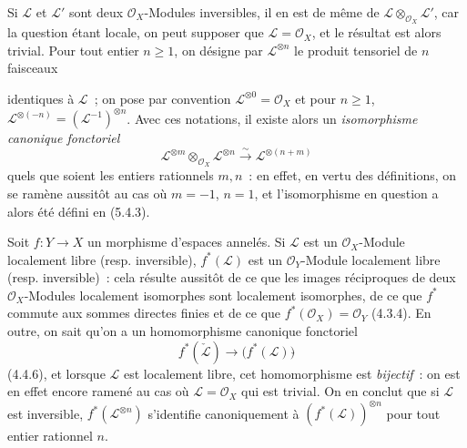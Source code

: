 \begin{env}[5.4.4]
\label{0.5.4.4-fr}
Si $\mathcal{L}$ et $\mathcal{L}'$ sont deux $\mathcal{O}_X$-Modules
inversibles, il en est de même de
$\mathcal{L}\otimes_{\mathcal{O}_X}\mathcal{L}'$, car la question étant
locale, on peut supposer que $\mathcal{L}=\mathcal{O}_X$, et le résultat est
alors trivial. Pour tout entier $n\geq1$, on désigne par
$\mathcal{L}^{\otimes n}$ le produit tensoriel de $n$ faisceaux


identiques à $\mathcal{L}$~; on pose par convention
$\mathcal{L}^{\otimes0}=\mathcal{O}_X$ et pour $n\geq1$,
$\mathcal{L}^{\otimes(-n)}=(\mathcal{L}^{-1})^{\otimes n}$. Avec ces
notations, il existe alors un \emph{isomorphisme canonique fonctoriel}
\[
  \mathcal{L}^{\otimes m}\otimes_{\mathcal{O}_X}\mathcal{L}^{\otimes n}
  \xrightarrow{\sim}
  \mathcal{L}^{\otimes(n+m)}
  \tag{5.4.4.1}\label{0.5.4.4.1-fr}
\]
quels que soient les entiers rationnels $m,n$~: en effet, en vertu des
définitions, on se ramène aussitôt au cas où $m=-1$, $n=1$, et
l'isomorphisme en question a alors été défini en (5.4.3).
\end{env}

\begin{env}[5.4.5]
Soit $f:Y\to X$ un morphisme d'espaces annelés. Si $\mathcal{L}$ est un
$\mathcal{O}_X$-Module localement libre (resp. inversible),
$f^*(\mathcal{L})$ est un $\mathcal{O}_Y$-Module localement libre (resp.
inversible)~: cela résulte aussitôt de ce que les images réciproques de deux
$\mathcal{O}_X$-Modules localement isomorphes sont localement isomorphes, de
ce que $f^*$ commute aux sommes directes finies et de ce que
$f^*(\mathcal{O}_X)=\mathcal{O}_Y$ (4.3.4). En outre, on sait qu'on a un
homomorphisme canonique fonctoriel
\[
  f^*(\check{\mathcal{L}})
  \longrightarrow
  \bigl(f^*(\mathcal{L})\bigr)\check{}
\]
(4.4.6), et lorsque $\mathcal{L}$ est localement libre, cet homomorphisme est
\emph{bijectif}~: on est en effet encore ramené au cas où
$\mathcal{L}=\mathcal{O}_X$ qui est trivial. On en conclut que si
$\mathcal{L}$ est inversible, $f^*(\mathcal{L}^{\otimes n})$ s'identifie
canoniquement à $(f^*(\mathcal{L}))^{\otimes n}$ pour tout entier rationnel
$n$.
\end{env}

